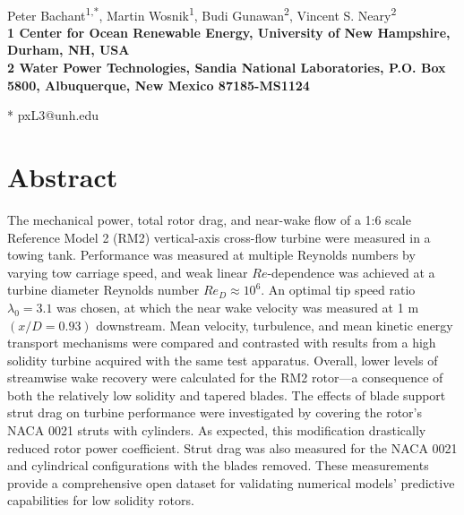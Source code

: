 \documentclass[10pt,letterpaper]{article}
\date{}
\begin{document}
\linenumbers
\vspace*{0.35in}

\begin{flushleft}

{\Large \textbf{}} \newline %
\\ Peter Bachant\textsuperscript{1,*}, Martin Wosnik\textsuperscript{1}, Budi
Gunawan\textsuperscript{2}, Vincent S. Neary\textsuperscript{2} \\ \bigskip
\bf{1} Center for Ocean Renewable Energy, University of New Hampshire, Durham,
NH, USA \\ \bf{2} Water Power Technologies, Sandia National Laboratories, P.O.
Box 5800, Albuquerque, New Mexico 87185-MS1124 \\ \bigskip

* pxL3@unh.edu

\end{flushleft}

\section*{Abstract}

The mechanical power, total rotor drag, and near-wake flow of a 1:6 scale
Reference Model 2 (RM2) vertical-axis cross-flow turbine were measured in a
towing tank. Performance was measured at multiple Reynolds numbers by varying
tow carriage speed, and weak linear $Re$-dependence was achieved at a turbine
diameter Reynolds number $Re_D \approx 10^6$. An optimal tip speed ratio
$\lambda_0 = 3.1$ was chosen, at which the near wake velocity was measured at 1
m $(x/D=0.93)$ downstream. Mean velocity, turbulence, and mean kinetic energy
transport mechanisms were compared and contrasted with results from a high
solidity turbine acquired with the same test apparatus. Overall, lower levels of
streamwise wake recovery were calculated for the RM2 rotor---a consequence of
both the relatively low solidity and tapered blades. The effects of blade
support strut drag on turbine performance were investigated by covering the
rotor's NACA 0021 struts with cylinders. As expected, this modification
drastically reduced rotor power coefficient. Strut drag was also measured for
the NACA 0021 and cylindrical configurations with the blades removed. These
measurements provide a comprehensive open dataset for validating numerical
models' predictive capabilities for low solidity rotors.
\end{document}
